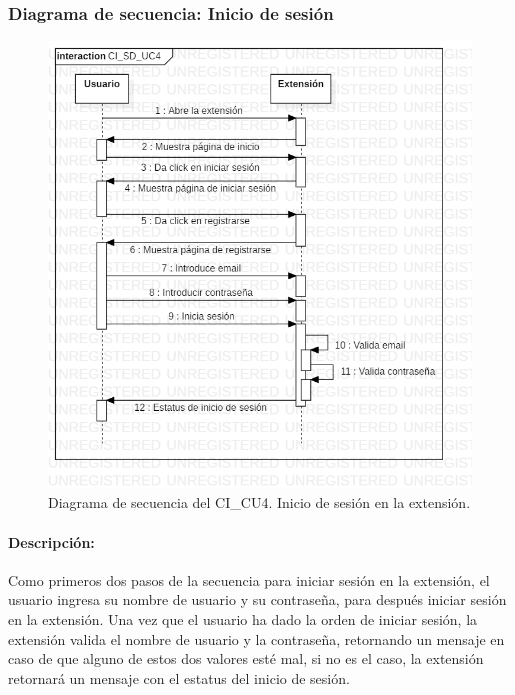 \documentclass[12pt, a4paper, titlepage]{report}
\begin{document}
    			\subsubsection{Diagrama de secuencia: Inicio de sesión}
    			    \begin{figure}[H]
    				    \begin{center} \includegraphics[width=14cm]{./imagenes/Disenio/Componente_1/CI_SD_UC4.png}
    				    \caption[Diagrama de secuencia 4 del Componente I]{Diagrama de secuencia del CI\_CU4. Inicio de sesión en la extensión.}
    			        \end{center}
    			    \end{figure}
    			    
    			    \paragraph{Descripción:}
        		    Como primeros dos pasos de la secuencia para iniciar sesión en la extensión, el usuario ingresa su nombre de usuario y su contraseña, para después iniciar sesión en la extensión. Una vez que el usuario ha dado la orden de iniciar sesión, la extensión valida el nombre de usuario y la contraseña, retornando un mensaje en caso de que alguno de estos dos valores esté mal, si no es el caso, la extensión retornará un mensaje con el estatus del inicio de sesión. 
    			
\end{document}
